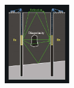 \documentclass{beamer}
\begin{document}
\begin{frame}
\begin{columns}
\begin{column}{0.5\textwidth}
      \begin{figure}
        \centering
        \includegraphics[width=\linewidth, height=3.5cm]{figs/borehole.png}
      \end{figure}
      
    \end{column}
  \end{columns}
\end{frame}

\begin{frame}
\end{frame}
\end{document}
